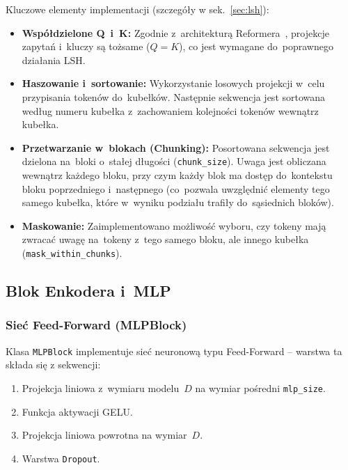 \documentclass[a4paper,11pt,twoside]{report}
\theoremstyle{definition}
\begin{document}
Kluczowe elementy implementacji (szczegóły w sek.~\ref{sec:lsh}):
\begin{itemize}
    \item \textbf{Współdzielone Q~i~K:} Zgodnie z~architekturą Reformera~\cite{Kitaev2020Reformer:}, projekcje zapytań i~kluczy są tożsame ($Q=K$), co jest wymagane do~poprawnego działania LSH.
    \item \textbf{Haszowanie i~sortowanie:} Wykorzystanie losowych projekcji w~celu przypisania tokenów do~kubełków. Następnie sekwencja jest sortowana według numeru kubełka z~zachowaniem kolejności tokenów wewnątrz kubełka.
    \item \textbf{Przetwarzanie w~blokach (Chunking):} Posortowana sekwencja jest dzielona na~bloki o~stałej długości (\texttt{chunk\_size}). Uwaga jest obliczana wewnątrz każdego bloku, przy czym każdy blok ma dostęp do~kontekstu bloku poprzedniego i~następnego (co~pozwala uwzględnić elementy tego samego kubełka, które w~wyniku podziału trafiły do~sąsiednich bloków).
    \item \textbf{Maskowanie:} Zaimplementowano możliwość wyboru, czy tokeny mają zwracać uwagę na~tokeny z~tego samego bloku, ale innego kubełka (\texttt{mask\_within\_chunks}).
\end{itemize}














\subsection{Blok Enkodera i~MLP}


\subsubsection{Sieć Feed-Forward (MLPBlock)}
Klasa \texttt{MLPBlock} implementuje sieć neuronową typu Feed-Forward -- warstwa ta składa się z sekwencji:
\begin{enumerate}
    \item Projekcja liniowa z~wymiaru modelu~$D$ na wymiar pośredni \texttt{mlp\_size}.
    \item Funkcja aktywacji GELU.
    \item Projekcja liniowa powrotna na wymiar~$D$.
    \item Warstwa \texttt{Dropout}.
\end{enumerate}
\end{document}
